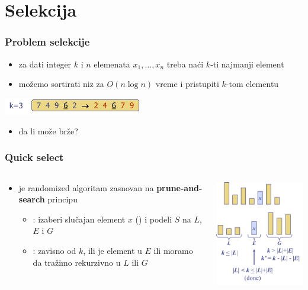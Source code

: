 \documentclass[compress]{beamer}
\begin{document}
\section[Selekcija]{Selekcija}

\begin{frame}
  \frametitle{Problem selekcije}
  \begin{itemize}
    \item za dati integer $k$ i $n$ elemenata $x_1, \ldots, x_n$ treba naći $k$-ti najmanji element
    \item možemo sortirati niz za $O(n\log n)$ vreme i pristupiti $k$-tom elementu
  \end{itemize}
  \begin{center}
    \includegraphics[width=6cm]{asp-12-pic35.png}
  \end{center}
  \begin{itemize}
    \item da li može brže?
  \end{itemize}
\end{frame}

\begin{frame}
  \frametitle{Quick select}
  \begin{columns}
    \begin{column}[t]{6cm}
      \begin{itemize}
        \item {} je randomized algoritam zasnovan na \textbf{prune-and-search} principu
        \begin{itemize}
          \item {}: izaberi slučajan element $x$ () i podeli $S$ na $L$, $E$ i $G$
          \item {}: zavisno od $k$, ili je element u $E$ ili moramo da tražimo rekurzivno u $L$ ili $G$
        \end{itemize}
      \end{itemize}
    \end{column}
    \begin{column}[t]{6cm}
      \begin{center}
        \includegraphics[width=6cm]{asp-12-pic36.png}
      \end{center}
    \end{column}
  \end{columns}
\end{frame}
\end{document}
